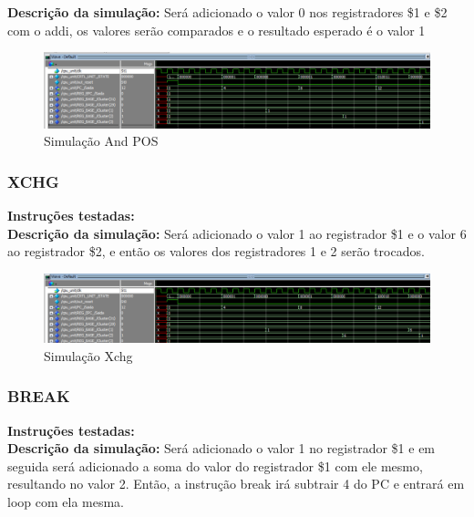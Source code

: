 \textbf{Descrição da simulação:} Será adicionado o valor 0 nos registradores \$1 e \$2 com o addi, os valores serão comparados e o resultado esperado é o valor 1 \\

\begin{figure}[htbp!]
\centering
\includegraphics[width=1\textwidth]{figure/simulacao_and_pos.png}
\caption{Simulação And POS} 
\label{fig:imagem_massa}
\end{figure}
\newpage

\subsubsection{XCHG}
\textbf{Instruções testadas:}
 \\

\textbf{Descrição da simulação:} Será adicionado o valor 1 ao registrador \$1 e o valor 6 ao registrador \$2, e então os valores dos registradores 1 e 2 serão trocados.  \\

\begin{figure}[htbp!]
\centering
\includegraphics[width=1\textwidth]{figure/simulacao_xchg.png}
\caption{Simulação Xchg} 
\label{fig:imagem_massa}
\end{figure}


\subsubsection{BREAK}
\textbf{Instruções testadas:}
 \\

\textbf{Descrição da simulação:} Será adicionado o valor 1 no registrador \$1 e em seguida será adicionado a soma do valor do registrador \$1 com ele mesmo, resultando no valor 2. Então, a instrução break irá subtrair 4 do PC e entrará em loop com ela mesma. \\

